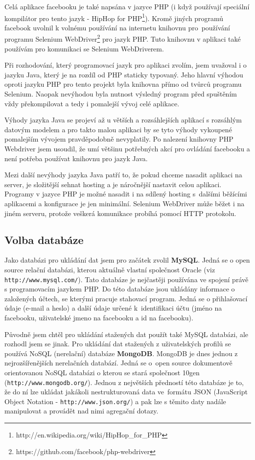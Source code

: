 \documentclass[thesis=M,czech]{FITthesis}[2013/05/10]
\begin{document}
Celá aplikace facebooku je také napsána v jazyce PHP (i když používají speciální kompilátor pro tento jazyk - HipHop for PHP\footnote{http://en.wikipedia.org/wiki/HipHop\_for\_PHP}). Kromě jiných programů facebook uvolnil k volnému používání na internetu knihovnu pro~používání programu Selenium WebDriver\footnote{https://github.com/facebook/php-webdriver} pro jazyk PHP. Tuto knihovnu v aplikaci také používám pro komunikaci se Selenium WebDriverem.

Při rozhodování, který programovací jazyk pro aplikaci zvolím, jsem uvažoval i o jazyku Java, který je na rozdíl od PHP staticky typovaný. Jeho hlavní výhodou oproti jazyku PHP pro tento projekt byla knihovna přímo od tvůrců programu Selenium. Naopak nevýhodou byla nutnost výsledný program před spuštěním vždy překompilovat a tedy i pomalejší vývoj celé aplikace. 

Výhody jazyka Java se projeví až u větších a rozsáhlejších aplikací s rozsáhlým datovým modelem a pro takto malou aplikaci by se tyto výhody vykoupené pomalejším vývojem pravděpodobně nevyplatily. Po nalezení  knihovny PHP Webdriver jsem usoudil, že umí většinu potřebných akcí pro ovládání facebooku a není potřeba používat knihovnu pro jazyk Java.

Mezi další nevýhody jazyka Java patří to, že pokud chceme nasadit aplikaci na server, je složitější sehnat hosting a je náročnější nastavit celou aplikaci. Programy v jazyce PHP je možné nasadit i na sdílený hosting s~dalšími běžícími aplikacemi a konfigurace je jen minimální. Selenium WebDriver může běžet i na jiném serveru, protože veškerá komunikace probíhá pomocí HTTP protokolu.

\subsection{Volba databáze}

Jako databázi pro ukládání dat jsem pro začátek zvolil \textbf{MySQL}. Jedná se o open source relační databázi, kterou aktuálně vlastní společnost Oracle (viz \verb|http://www.mysql.com/|). Tato databáze je nejčastěji používána ve spojení právě s programovacím jazykem PHP. Do této databáze jsou ukládány informace o založených účtech, se kterými pracuje stahovací program. Jedná se o přihlašovací údaje (e-mail a heslo) a další údaje určené k~identifikaci účtu (jméno na facebooku, uživatelské jmeno na facebooku a id na facebooku).

Původně jsem chtěl pro ukládání stažených dat použít také MySQL databázi, ale rozhodl jsem se jinak. Pro ukládání dat stažených z uživatelských profilů se používá NoSQL (nerelační) databáze \textbf{MongoDB}. MongoDB je dnes jednou z nejrozšířenějších nerelačních databází. Jedná se o~open source dokumentově orientovanou NoSQL databázi o kterou se stará společnost 10gen (\verb|http://www.mongodb.org/|). Jednou z největších předností této databáze je to, že do ní lze ukládat jakákoli nestrukturovaná data ve~formátu JSON (JavaScript Object Notation - \verb|http://www.json.org/|) a pak lze s těmito daty nadále manipulovat a provádět nad nimi agregační dotazy. 
\end{document}
